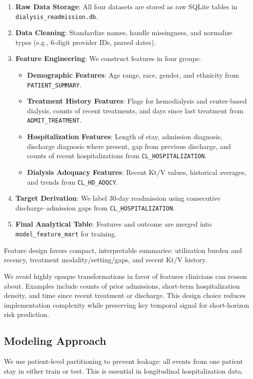\documentclass[conference]{IEEEtran}
\begin{document}
\begin{enumerate}
    \item \textbf{Raw Data Storage}: All four datasets are stored as raw SQLite tables in \texttt{dialysis_readmission.db}.
    \item \textbf{Data Cleaning}: Standardize names, handle missingness, and normalize types (e.g., 6-digit provider IDs, parsed dates).
    \item \textbf{Feature Engineering}: We construct features in four groups:
    \begin{itemize}
        \item \textbf{Demographic Features}: Age range, race, gender, and ethnicity from \texttt{PATIENT_SUMMARY}.
        \item \textbf{Treatment History Features}: Flags for hemodialysis and center-based dialysis, counts of recent treatments, and days since last treatment from \texttt{ADMIT_TREATMENT}.
        \item \textbf{Hospitalization Features}: Length of stay, admission diagnosis, discharge diagnosis where present, gap from previous discharge, and counts of recent hospitalizations from \texttt{CL_HOSPITALIZATION}.
        \item \textbf{Dialysis Adequacy Features}: Recent Kt/V values, historical averages, and trends from \texttt{CL_HD_ADQCY}.
    \end{itemize}
    \item \textbf{Target Derivation}: We label 30-day readmission using consecutive discharge--admission gaps from \texttt{CL_HOSPITALIZATION}.
    \item \textbf{Final Analytical Table}: Features and outcome are merged into \texttt{model_feature_mart} for training.
\end{enumerate}

Feature design favors compact, interpretable summaries: utilization burden and recency, treatment modality/setting/gaps, and recent Kt/V history.

We avoid highly opaque transformations in favor of features clinicians can reason about. Examples include counts of prior admissions, short-term hospitalization density, and time since recent treatment or discharge. This design choice reduces implementation complexity while preserving key temporal signal for short-horizon risk prediction.

\subsection{Modeling Approach}
We use patient-level partitioning to prevent leakage: all events from one patient stay in either train or test. This is essential in longitudinal hospitalization data.
\end{document}
